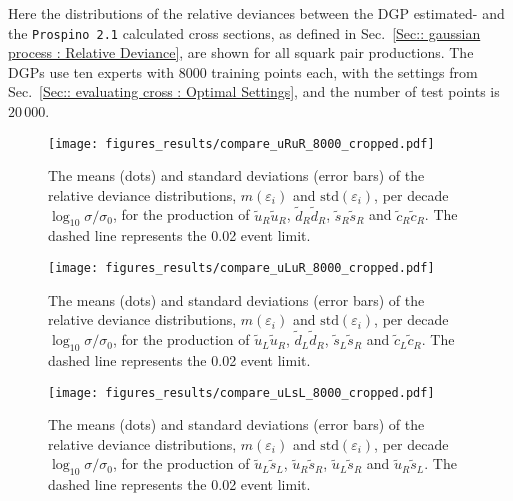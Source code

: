 \documentclass[twoside,english]{uiofysmaster}
\begin{document}
{{\begin{appendices}
Here the distributions of the relative deviances between the DGP estimated- and the \verb|Prospino 2.1| calculated cross sections, as defined in Sec.~\ref{Sec:: gaussian process : Relative Deviance}, are shown for all squark pair productions. The DGPs use ten experts with 8000 training points each, with the settings from Sec.~\ref{Sec:: evaluating cross : Optimal Settings}, and the number of test points is $20\,000$.

\begin{figure}[H]
\centering
\texttt{[image: figures\_results/compare\_uRuR\_8000\_cropped.pdf]}
\caption[Relative deviance distributions $\widetilde{u}_R \widetilde{u}_R$, $\widetilde{d}_R \widetilde{d}_R$, $\widetilde{s}_R \widetilde{s}_R$ and $\widetilde{c}_R \widetilde{c}_R$]{The means (dots) and standard deviations (error bars) of the relative deviance distributions, $m(\varepsilon_i)$ and $\mathrm{std}(\varepsilon_i)$, per decade $\log_{10} \sigma / \sigma_0$, for the production of $\widetilde{u}_R \widetilde{u}_R$, $\widetilde{d}_R \widetilde{d}_R$, $\widetilde{s}_R \widetilde{s}_R$ and $\widetilde{c}_R \widetilde{c}_R$. The dashed line represents the 0.02 event limit.}
\end{figure}

\begin{figure}
\centering
\texttt{[image: figures\_results/compare\_uLuR\_8000\_cropped.pdf]}
\caption[Relative deviance distributions $\widetilde{u}_L \widetilde{u}_R$, $\widetilde{d}_L \widetilde{d}_R$, $\widetilde{s}_L \widetilde{s}_R$ and $\widetilde{c}_L \widetilde{c}_R$]{The means (dots) and standard deviations (error bars) of the relative deviance distributions, $m(\varepsilon_i)$ and $\mathrm{std}(\varepsilon_i)$, per decade $\log_{10} \sigma / \sigma_0$, for the production of $\widetilde{u}_L \widetilde{u}_R$, $\widetilde{d}_L \widetilde{d}_R$, $\widetilde{s}_L \widetilde{s}_R$ and $\widetilde{c}_L \widetilde{c}_R$. The dashed line represents the 0.02 event limit.}
\end{figure}

\begin{figure}
\centering
\texttt{[image: figures\_results/compare\_uLsL\_8000\_cropped.pdf]}
\caption[Relative deviance distributions $\widetilde{u}_L \widetilde{s}_L$, $\widetilde{u}_R \widetilde{s}_R$, $\widetilde{u}_L \widetilde{s}_R$ and $\widetilde{u}_R \widetilde{s}_L$]{The means (dots) and standard deviations (error bars) of the relative deviance distributions, $m(\varepsilon_i)$ and $\mathrm{std}(\varepsilon_i)$, per decade $\log_{10} \sigma / \sigma_0$, for the production of $\widetilde{u}_L \widetilde{s}_L$, $\widetilde{u}_R \widetilde{s}_R$, $\widetilde{u}_L \widetilde{s}_R$ and $\widetilde{u}_R \widetilde{s}_L$. The dashed line represents the 0.02 event limit.}
\end{figure}


\end{appendices}}}
\end{document}
